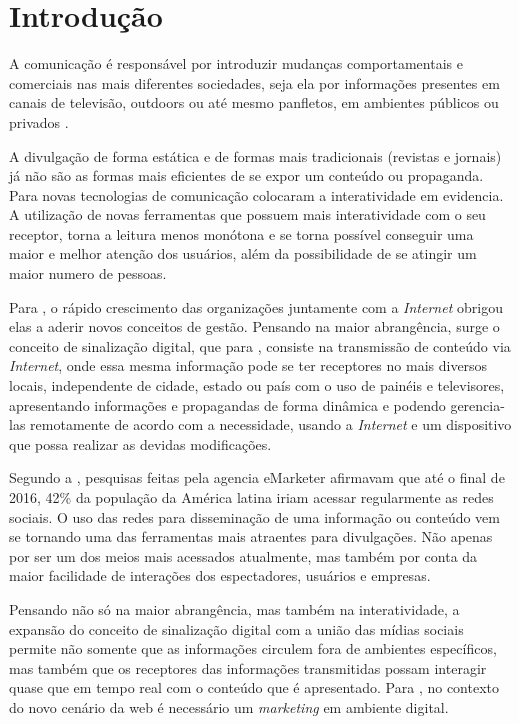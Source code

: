 \chapter[Introdução]{Introdução}

A comunicação é responsável por introduzir mudanças comportamentais e comerciais nas mais diferentes sociedades, seja ela por informações presentes em canais de televisão, outdoors ou até mesmo panfletos, em ambientes públicos ou privados \cite{silva2007}.

A divulgação de forma estática e de formas mais tradicionais (revistas e jornais) já não são as formas mais eficientes de se expor um conteúdo ou propaganda. Para \cite{escobar2007} novas tecnologias de comunicação colocaram a interatividade em evidencia. A utilização de novas ferramentas que possuem mais interatividade com o seu receptor, torna a leitura menos monótona e se torna possível conseguir uma maior e melhor atenção dos usuários, além da possibilidade de se atingir um maior numero de pessoas.

Para \cite{machado2010}, o rápido crescimento das organizações juntamente com a \textit{Internet} obrigou elas a aderir novos conceitos de gestão. Pensando na maior abrangência, surge o conceito de sinalização digital, que para \cite{machado2010}, consiste na transmissão de conteúdo via \textit{Internet},  onde essa mesma informação pode se ter receptores no mais diversos locais, independente de cidade, estado ou país com o uso de painéis e televisores, apresentando informações e propagandas de forma dinâmica e podendo gerencia-las remotamente de acordo com a necessidade, usando a \textit{Internet} e um dispositivo que possa realizar as devidas modificações. 

Segundo a \cite{forbes2016}, pesquisas feitas pela agencia eMarketer afirmavam que até o final de 2016, 42\% da população da América latina iriam acessar regularmente as redes sociais. O uso das redes para disseminação de uma informação ou conteúdo vem se tornando uma das ferramentas mais atraentes para divulgações. Não apenas por ser um dos meios mais acessados atualmente, mas também por conta da maior facilidade de interações dos espectadores, usuários e empresas.

Pensando não só na maior abrangência, mas também na interatividade, a expansão do conceito de sinalização digital com a união das mídias sociais permite não somente que as informações circulem fora de ambientes específicos, mas também que os receptores das informações transmitidas possam interagir quase que em tempo real com o conteúdo que é apresentado. Para \cite{santos2014}, no contexto do novo cenário da web é necessário um \textit{marketing} em ambiente digital. 

